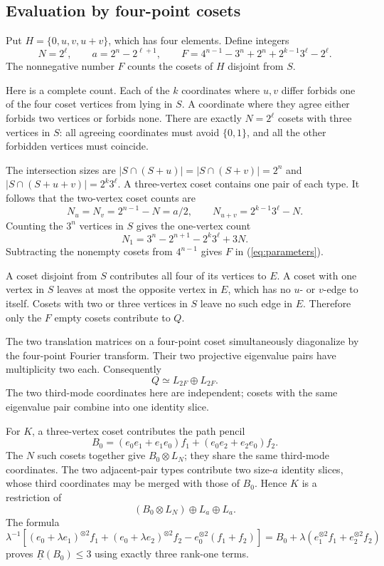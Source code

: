 \documentclass[11pt,letterpaper]{article}
\theoremstyle{definition}\newtheorem{definition}[theorem]{Definition}
\theoremstyle{remark}\newtheorem{remark}[theorem]{Remark}
\newcommand{\BR}{\underline R}
\begin{document}
\subsection{Evaluation by four-point cosets}
Put $H=\{0,u,v,u+v\}$, which has four elements. Define integers
\begin{equation}\label{eq:parameters}
N=2^\ell,\qquad a=2^n-2^{\ell+1},\qquad
F=4^{n-1}-3^n+2^n+2^{k-1}3^\ell-2^\ell.
\end{equation}
The nonnegative number $F$ counts the cosets of $H$ disjoint from $S$.

Here is a complete count. Each of the $k$ coordinates where $u,v$ differ forbids one of the four coset vertices from lying in $S$. A coordinate where they agree either forbids two vertices or forbids none. There are exactly $N=2^\ell$ cosets with three vertices in $S$: all agreeing coordinates must avoid $\{0,1\}$, and all the other forbidden vertices must coincide.

The intersection sizes are $|S\cap(S+u)|=|S\cap(S+v)|=2^n$ and $|S\cap(S+u+v)|=2^k3^\ell$. A three-vertex coset contains one pair of each type. It follows that the two-vertex coset counts are
\[
N_u=N_v=2^{n-1}-N=a/2,\qquad
N_{u+v}=2^{k-1}3^\ell-N.
\]
Counting the $3^n$ vertices in $S$ gives the one-vertex count
\[
N_1=3^n-2^{n+1}-2^k3^\ell+3N.
\]
Subtracting the nonempty cosets from $4^{n-1}$ gives $F$ in (\ref{eq:parameters}).

A coset disjoint from $S$ contributes all four of its vertices to $E$. A coset with one vertex in $S$ leaves at most the opposite vertex in $E$, which has no $u$- or $v$-edge to itself. Cosets with two or three vertices in $S$ leave no such edge in $E$. Therefore only the $F$ empty cosets contribute to $Q$.

The two translation matrices on a four-point coset simultaneously diagonalize by the four-point Fourier transform. Their two projective eigenvalue pairs have multiplicity two each. Consequently
\begin{equation}\label{eq:Q}
Q\simeq L_{2F}\oplus L_{2F}.
\end{equation}
The two third-mode coordinates here are independent; cosets with the same eigenvalue pair combine into one identity slice.

For $K$, a three-vertex coset contributes the path pencil
\[
B_0=(e_0e_1+e_1e_0)f_1+(e_0e_2+e_2e_0)f_2.
\]
The $N$ such cosets together give $B_0\otimes L_N$; they share the same third-mode coordinates. The two adjacent-pair types contribute two size-$a$ identity slices, whose third coordinates may be merged with those of $B_0$. Hence $K$ is a restriction of
\begin{equation}\label{eq:K}
(B_0\otimes L_N)\oplus L_a\oplus L_a.
\end{equation}
The formula
\[
\lambda^{-1}\left[(e_0+\lambda e_1)^{\otimes2}f_1+(e_0+\lambda e_2)^{\otimes2}f_2-e_0^{\otimes2}(f_1+f_2)\right]
=B_0+\lambda(e_1^{\otimes2}f_1+e_2^{\otimes2}f_2)
\]
proves $\BR(B_0)\leq3$ using exactly three rank-one terms.
\end{document}
